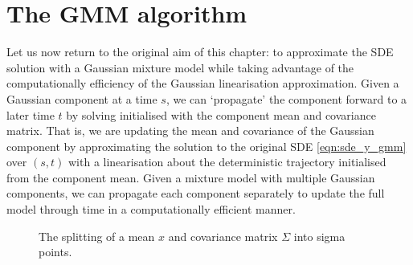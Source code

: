 \section{The GMM algorithm}\label{sec:gmm_alg}
Let us now return to the original aim of this chapter: to approximate the SDE solution with a Gaussian mixture model while taking advantage of the computationally efficiency of the Gaussian linearisation approximation.
Given a Gaussian component at a time \(s\), we can `propagate' the component forward to a later time \(t\) by solving  initialised with the component mean and covariance matrix.
That is, we are updating the mean and covariance of the Gaussian component by approximating the solution to the original SDE \cref{eqn:sde_y_gmm} over \((s,t)\) with a linearisation about the deterministic trajectory initialised from the component mean.
Given a mixture model with multiple Gaussian components, we can propagate each component separately to update the full model through time in a computationally efficient manner.

\begin{figure}
	\centering
	\begin{tikzpicture}

	\end{tikzpicture}
	\caption{The splitting of a mean \(x\) and covariance matrix \(\Sigma\) into sigma points.}
	\label{fig:sigma_points_ex}
\end{figure}

